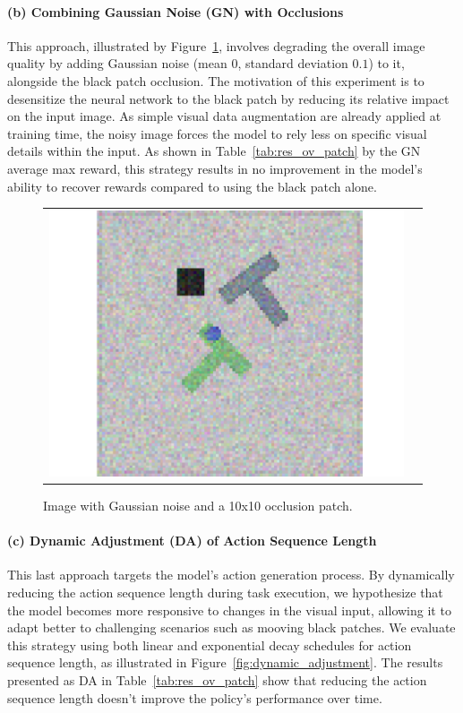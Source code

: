 \paragraph{(b) Combining Gaussian Noise (GN) with Occlusions}
This approach, illustrated by Figure~\ref{fig:patch_noise}, involves degrading the overall image quality by adding Gaussian noise (mean $0$, standard deviation $0.1$) to it, alongside the black patch occlusion.
The motivation of this experiment is to desensitize the neural network to the black patch by reducing its relative impact on the input image.
As simple visual data augmentation are already applied at training time, the noisy image forces the model to rely less on specific visual details within the input.
As shown in Table~\ref{tab:res_ov_patch} by the GN average max reward, this strategy results in no improvement in the model's ability to recover rewards compared to using the black patch alone.
\begin{figure}[!htb]
    \centering
    \begin{tabular}{cc}
      \includegraphics[width=0.49\linewidth]{figures/illustration_patch_noise.pdf}
    \end{tabular}
    \caption{Image with Gaussian noise and a 10x10 occlusion patch.}
    \label{fig:patch_noise}

\end{figure}

\paragraph{(c) Dynamic Adjustment (DA) of Action Sequence Length}
This last approach targets the model's action generation process.
By dynamically reducing the action sequence length during task execution, we hypothesize that the model becomes more responsive to changes in the visual input, allowing it to adapt better to challenging scenarios such as mooving black patches.
We evaluate this strategy using both linear and exponential decay schedules for action sequence length, as illustrated in Figure~\ref{fig:dynamic_adjustment}.
The results presented as DA in Table~\ref{tab:res_ov_patch} show that reducing the action sequence length doesn't improve the policy's performance over time.

